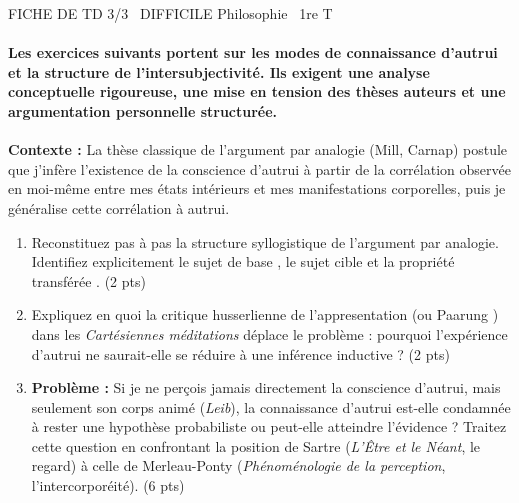 \documentclass[11pt]{article}
\begin{document}
\begin{tcolorbox}[enhanced,colback=popink,colframe=popink,arc=10pt,boxrule=0pt,left=12pt,right=12pt,top=9pt,bottom=9pt]
{\color{white}\popxbold\small FICHE DE TD 3/3 \textbullet\ DIFFICILE \hfill Philosophie \textbullet\ 1re T\par}
\end{tcolorbox}
\vspace{4pt}
\paragraph{Les exercices suivants portent sur les modes de connaissance d'autrui et la structure de l'intersubjectivité. Ils exigent une analyse conceptuelle rigoureuse, une mise en tension des thèses auteurs et une argumentation personnelle structurée.}

\begin{exercice}
\textbf{Contexte :} La thèse classique de l'argument par analogie (Mill, Carnap) postule que j'infère l'existence de la conscience d'autrui à partir de la corrélation observée en moi-même entre mes états intérieurs et mes manifestations corporelles, puis je généralise cette corrélation à autrui.

\begin{enumerate}
    \item Reconstituez pas à pas la structure syllogistique de l'argument par analogie. Identifiez explicitement le \og sujet de base \fg{}, le \og sujet cible \fg{} et la \og propriété transférée \fg{}. (2 pts)
    \item Expliquez en quoi la critique husserlienne de l'\og appresentation \fg{} (ou \og Paarung \fg{}) dans les \textit{Cartésiennes méditations} déplace le problème : pourquoi l'expérience d'autrui ne saurait-elle se réduire à une inférence inductive ? (2 pts)
    \item \textbf{Problème :} \og Si je ne perçois jamais directement la conscience d'autrui, mais seulement son corps animé (\textit{Leib}), la connaissance d'autrui est-elle condamnée à rester une hypothèse probabiliste ou peut-elle atteindre l'évidence ? \fg{} Traitez cette question en confrontant la position de Sartre (\textit{L'Être et le Néant}, le regard) à celle de Merleau-Ponty (\textit{Phénoménologie de la perception}, l'intercorporéité). (6 pts)
\end{enumerate}
\end{exercice}
\end{document}
